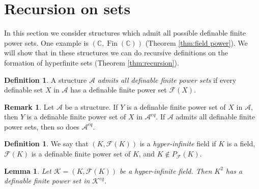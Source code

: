\documentclass{amsart}
\newcommand{\C}{\mathbb C}
\newcommand{\ca}{\mathcal}
\newcommand{\Fin}{\operatorname{Fin}}
\newcommand{\nin}{\not \in}
\theoremstyle{plain}
\newtheorem{lem}[thm]{Lemma}
\theoremstyle{definition}
\newtheorem{rem}[thm]{Remark}
\newtheorem{defn}[thm]{Definition}
\newcommand{\F}{\mathcal{F}}
\newcommand{\pF}{P_{\ca F}}
\begin{document}
\section{Recursion on sets}\label{sec:rec-on-sets}
In this section we consider structures which admit all possible definable finite power sets. One example is $(\C, \Fin(\C))$ (Theorem \ref{thm:field power}).   
We will show that in these structures we can do recursive definitions on the formation of hyperfinite sets (Theorem \ref{thm:recursion}). 

\begin{defn} A structure $\ca A$ \emph{admits all definable finite power sets} if every definable set $X$ in $\ca A$ has a definable finite power set $\F(X)$. 
\end{defn} 

\begin{rem}
    Let $\ca A$ be a structure. If $Y$ is a definable finite power set of $X$ in $\ca A$, then $Y$ is a definable finite power set of $X$ in $\ca A^{eq}$. If $\ca A$ admits all definable finite power sets, then so does $\ca A^{eq}$. 
\end{rem}

\begin{defn} 
We say that $(K,\F(K))$ is a {\em hyper-infinite} field if $K$ is a field, $\F(K)$ is a definable finite power set of $K$, and $K\nin \pF(K)$.
\end{defn}

\begin{lem} \label{lem:nonstandard-sets-of-pairs} Let $\ca K=(K, \F(K))$ be a hyper-infinite field. Then $K^2$ has a definable finite power set in $\ca K^{eq}$. 
\end{lem}
\end{document}
